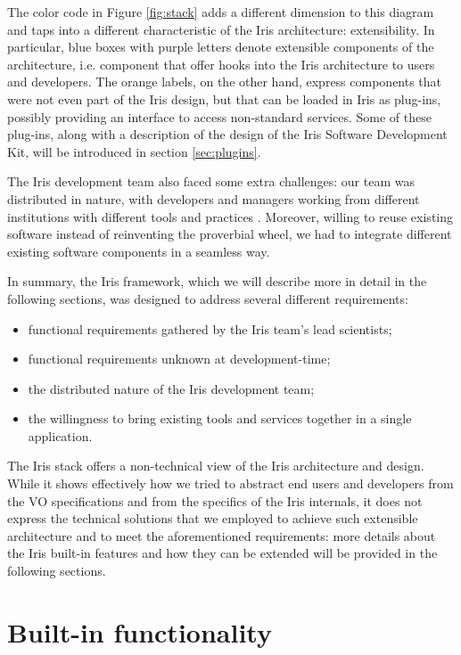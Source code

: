 \documentclass[5p]{elsarticle}
\begin{document}
The color code in Figure \ref{fig:stack} adds a different dimension to this diagram and taps into a different characteristic of the Iris architecture: extensibility. In particular, blue boxes with purple letters denote extensible components of the architecture, i.e. component that offer hooks into the Iris architecture to users and developers. The orange labels, on the other hand, express components that were not even part of the Iris design, but that can be loaded in Iris as plug-ins, possibly providing an interface to access non-standard services. Some of these plug-ins, along with a description of the design of the Iris Software Development Kit, will be introduced in section \ref{sec:plugins}.

The Iris development team also faced some extra challenges: our team was distributed in nature, with developers and managers working from different institutions with different tools and practices \citep{2012SPIE.8449E..0IE}. Moreover, willing to reuse existing software instead of reinventing the proverbial wheel, we had to integrate different existing software components in a seamless way.

In summary, the Iris framework, which we will describe more in detail in the following sections, was designed to address several different requirements:
\begin{itemize}
\item functional requirements gathered by the Iris team's lead scientists;
\item functional requirements unknown at development-time;
\item the distributed nature of the Iris development team;
\item the willingness to bring existing tools and services together in a single application.
\end{itemize}

The Iris stack offers a non-technical view of the Iris architecture and design. While it shows effectively how we tried to abstract end users and developers from the VO specifications and from the specifics of the Iris internals, it does not express the technical solutions that we employed to achieve such extensible architecture and to meet the aforementioned requirements: more details about the Iris built-in features and how they can be extended will be provided in the following sections.

\section{Built-in functionality}
\label{sec:builtin}
\end{document}
